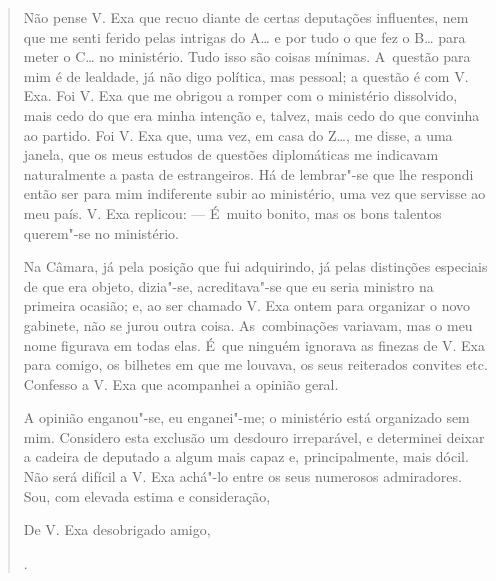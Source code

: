 \begin{linenumbers}
\begin{quote}
Não pense V. Exa que recuo diante de certas deputações influentes, nem
que me senti ferido pelas intrigas do A\ldots{} e por tudo o que fez o B\ldots{}
para meter o C\ldots{} no ministério. Tudo isso são coisas mínimas. A~questão
para mim é de lealdade, já não digo política, mas pessoal; a questão é
com V. Exa. Foi V. Exa que me obrigou a romper com o ministério
dissolvido, mais cedo do que era minha intenção e, talvez, mais cedo do
que convinha ao partido. Foi V. Exa que, uma vez, em casa do Z\ldots{}, me
disse, a uma janela, que os meus estudos de questões diplomáticas me
indicavam naturalmente a pasta de estrangeiros. Há de lembrar"-se que lhe
respondi então ser para mim indiferente subir ao ministério, uma vez que
servisse ao meu país. V. Exa replicou: --- É~muito bonito, mas os bons
talentos querem"-se no ministério.

Na Câmara, já pela posição que fui adquirindo, já pelas distinções
especiais de que era objeto, dizia"-se, acreditava"-se que eu seria
ministro na primeira ocasião; e, ao ser chamado V. Exa ontem para
organizar o novo gabinete, não se jurou outra coisa. As~combinações
variavam, mas o meu nome figurava em todas elas. É~que ninguém ignorava
as finezas de V. Exa para comigo, os bilhetes em que me louvava, os seus
reiterados convites etc. Confesso a V. Exa que acompanhei a opinião
geral.

A opinião enganou"-se, eu enganei"-me; o ministério está organizado sem
mim. Considero esta exclusão um desdouro irreparável, e determinei
deixar a cadeira de deputado a algum mais capaz e, principalmente, mais
dócil. Não será difícil a V. Exa achá"-lo entre os seus numerosos
admiradores. Sou, com elevada estima e consideração,

De V. Exa desobrigado amigo,

.
\end{quote}


\end{linenumbers}
